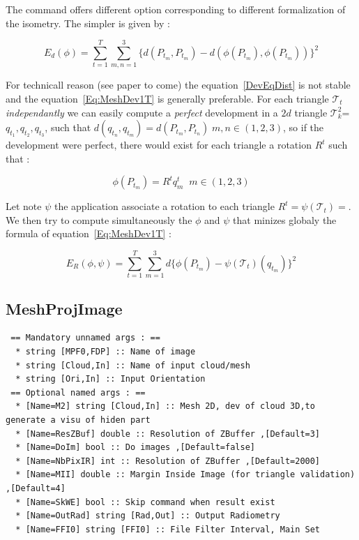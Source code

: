 The command offers different option corresponding to different formalization of the isometry.
The simpler is given by :

\begin{equation}
   E_d(\phi) =   \sum_{t=1}^T \sum_{m,n=1}^3  \{ d(P_{t_m},P_{t_m})-  d(\phi(P_{t_m}),\phi(P_{t_m})) \}  ^2
   \label{DevEqDist}
\end{equation}

For technicall reason (see paper to come) the equation~\ref{DevEqDist} is not stable and
the equation~\ref{Eq:MeshDev1T} is generally preferable.
For each triangle  $\mathcal{T}_t$ \emph{independantly} we can easily compute a \emph{perfect} development
in a $2d$ triangle $\mathcal{T}^2_k$= $q_{t_1},q_{t_2},q_{t_3}$, such that 
$d(q_{t_n},q_{t_m})=d(P_{t_m},P_{t_n}) \; m,n \in (1,2,3)$, so if the development
were perfect, there would exist for each triangle a rotation $R^t$ such that :

\begin{equation}
	\phi(P_{t_m}) =  R^t q^t_m  \;\; m \in (1,2,3) \label{Eq:MeshDev1T}
\end{equation}


Let note $\psi$ the application associate a rotation to each triangle $R^t = \psi(\mathcal{T}_t)=$.
We then try to compute simultaneously the $\phi$ and $\psi$ that minizes globaly the 
formula of equation~\ref{Eq:MeshDev1T} :

\begin{equation}
    E_R(\phi,\psi)= \sum_{t=1}^T \sum_{m=1}^3  d\{\phi(P_{t_m}) - \psi(\mathcal{T}_t)(q_{t_m})\} ^2
\end{equation}


\subsection{MeshProjImage}

\begin{verbatim}
 == Mandatory unnamed args : ==
  * string [MPF0,FDP] :: Name of image
  * string [Cloud,In] :: Name of input cloud/mesh
  * string [Ori,In] :: Input Orientation
 == Optional named args : ==
  * [Name=M2] string [Cloud,In] :: Mesh 2D, dev of cloud 3D,to generate a visu of hiden part 
  * [Name=ResZBuf] double :: Resolution of ZBuffer ,[Default=3]
  * [Name=DoIm] bool :: Do images ,[Default=false]
  * [Name=NbPixIR] int :: Resolution of ZBuffer ,[Default=2000]
  * [Name=MII] double :: Margin Inside Image (for triangle validation) ,[Default=4]
  * [Name=SkWE] bool :: Skip command when result exist
  * [Name=OutRad] string [Rad,Out] :: Output Radiometry 
  * [Name=FFI0] string [FFI0] :: File Filter Interval, Main Set
\end{verbatim}

